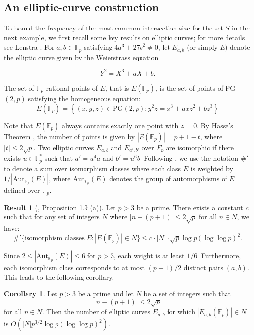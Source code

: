 \documentclass[10pt]{article}
\newcommand{\F}{\mathbb{F}}
\newcommand{\PG}{\mathrm{PG}}
\theoremstyle{definition}
\newtheorem{corollary}[thm]{Corollary}
\newtheorem{result}[thm]{Result}
\newcommand{\zs}[1]{\textcolor{magenta}{\textbf{#1}}}
\begin{document}
	\subsection[An elliptic-curve construction]{{An elliptic-curve construction}} %
	
	To bound the frequency of the most common intersection size for the set $S$ in the next example, we first recall some key results on elliptic curves; for more details see Lenstra \cite{Lenstra}. For \(a,b\in \mathbb F_p\) satisfying \(4a^3+27b^2\neq 0\), let \(E_{a,b}\) (or simply $E$) denote the elliptic curve given by the Weierstrass equation
	
	\[
	Y^2 = X^3 + aX + b.
	\]
	
	The set of $\mathbb{F}_p$-rational points of $E$, that is $E( \mathbb{F}_p )$, is the set of points of PG$(2, p)$ satisfying the homogeneous equation:
	\[
	E(\F_p) = \left\{(x, y, z) \in \PG(2, p) : y^2z = x^3+ axz^2 + bz^3\right\}
	\]
	
	
	Note that $E(\F_p)$ always contains exactly one point with $z=0$. By Hasse's Theorem \cite{Hasse1, Hasse2}, the number of points is given by $|E(\mathbb{F}_p)| = p + 1 - t$, where $|t| \leq 2\sqrt{p}$.
	Two elliptic curves $E_{a,b}$ and $E_{a', b'}$ over $F_p$ are isomorphic if there exists $u \in \F_p^*$ such that $a' = u^4a$ and $b'=u^6b$. Following \cite{Lenstra}, we use the notation $\# '$ to denote a sum over isomorphism classes where each class $E$ is weighted by $1/|\mathrm{Aut}_{\F_p}(E)|$, where $\mathrm{Aut}_{\F_p}(E)$ denotes the group of automorphisms of $E$ defined over $\F_p$. 
	
	\begin{result}[\cite{Lenstra}, Proposition 1.9 (a)]
		Let $p > 3$ be a prime. There exists a constant $c$ such that for any set of integers $N$ where $|n - (p + 1)| \leq 2\sqrt{p}$ for all $n \in N$, we have:
		\[
		\# ' \{ \text{isomorphism classes } E: |E(\mathbb{F}_p)| \in N \} \leq c \cdot |N| \cdot \sqrt{p} \log p (\log \log p)^2.
		\]
	\end{result}
	
	Since $2 \leq |\mathrm{Aut}_{\mathbb{F}_p}(E)| \leq 6$ for $p > 3$, each weight is at least $1/6$. Furthermore, each isomorphism class corresponds to at most $(p-1)/2$ distinct pairs $(a, b)$. This leads to the following corollary.
	
	\begin{corollary}
		\label{cor:lenstra}
		Let \(p>3\) be a prime and let \(N\) be a set of integers such that $$|n-(p+1)|\le 2\sqrt p$$ for all \(n\in N\). Then the number of elliptic curves \(E_{a,b}\) for which \(|E_{a,b}(\mathbb F_p)|\in N\) is
		$
		O(|N| p^{3/2} \log p (\log \log p)^2).
		$
	\end{corollary}
	
\end{document}
